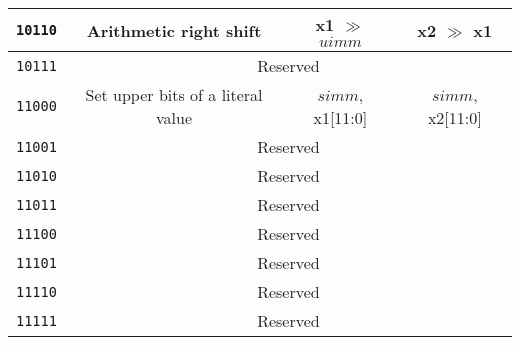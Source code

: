 \begin{center}
\begin{longtable}{|c|c|c|c|}
      \texttt{10110}                       &                      
      Arithmetic right shift               &
      x1 $\gg$ $uimm$                      &
      x2 $\gg$ x1                          \\ \hline

      \texttt{10111}                       &
      \multicolumn{3}{c|}{Reserved}        \\ \hline

      \texttt{11000}                       &
      Set upper bits of a literal value    &
      {$simm$, x1[11:0]}                   &   
      {$simm$, x2[11:0]}                   \\ \hline
 
      \texttt{11001}                       &
      \multicolumn{3}{c|}{Reserved}        \\ \hline


      \texttt{11010}                       &
      \multicolumn{3}{c|}{Reserved}        \\ \hline

      \texttt{11011}                       &
      \multicolumn{3}{c|}{Reserved}        \\ \hline

      \texttt{11100}                       &
      \multicolumn{3}{c|}{Reserved}        \\ \hline

      \texttt{11101}                       &
      \multicolumn{3}{c|}{Reserved}        \\ \hline

      \texttt{11110}                       &
      \multicolumn{3}{c|}{Reserved}        \\ \hline

      \texttt{11111}                       &
      \multicolumn{3}{c|}{Reserved}        \\ \hline
    
  \end{longtable}
\end{center}  
\endgroup

